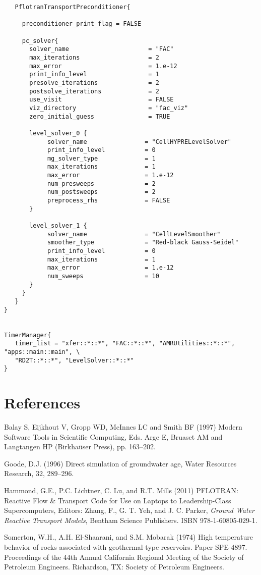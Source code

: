 \documentclass[12pt]{article}
\begin{document}
\begin{verbatim}
   PflotranTransportPreconditioner{

     preconditioner_print_flag = FALSE

     pc_solver{
       solver_name                      = "FAC"
       max_iterations                   = 2 
       max_error                        = 1.e-12
       print_info_level                 = 1 
       presolve_iterations              = 2
       postsolve_iterations             = 2
       use_visit                        = FALSE
       viz_directory                    = "fac_viz"
       zero_initial_guess               = TRUE

       level_solver_0 {
            solver_name                = "CellHYPRELevelSolver"
            print_info_level           = 0 
            mg_solver_type             = 1
            max_iterations             = 1
            max_error                  = 1.e-12
            num_presweeps              = 2
            num_postsweeps             = 2
            preprocess_rhs             = FALSE
       }

       level_solver_1 {
            solver_name                = "CellLevelSmoother"
            smoother_type              = "Red-black Gauss-Seidel"
            print_info_level           = 0 
            max_iterations             = 1
            max_error                  = 1.e-12
            num_sweeps                 = 10
       }
     } 
   }
}


TimerManager{
   timer_list = "xfer::*::*", "FAC::*::*", "AMRUtilities::*::*", "apps::main::main", \
   "RD2T::*::*", "LevelSolver::*::*"
}
\end{verbatim}

\normalsize
\section{References}

\begin{description}

\item Balay S, Eijkhout V, Gropp WD, McInnes LC and Smith BF (1997) Modern Software Tools in Scientific Computing, Eds. Arge E, Bruaset AM and Langtangen HP (Birkha\"user Press), pp. 163--202.

\item Goode, D.J. (1996) Direct simulation of groundwater age, Water Resources Research, 32, 289--296.

\item Hammond, G.E., P.C. Lichtner, C. Lu, and R.T. Mills (2011) PFLOTRAN: Reactive Flow \& Transport Code for Use on Laptops to Leadership-Class Supercomputers, Editors: Zhang, F., G. T. Yeh, and J. C. Parker,
{\em Ground Water Reactive Transport Models},
Bentham Science Publishers.
ISBN 978-1-60805-029-1. 

\item Somerton, W.H., A.H. El-Shaarani, and S.M. Mobarak (1974) 
High temperature behavior of rocks associated with geothermal-type reservoirs. Paper SPE-4897. Proceedings of the 44th Annual 
California Regional Meeting of the Society of Petroleum Engineers. Richardson, TX: Society of Petroleum Engineers. 


\end{description}
\end{document}
